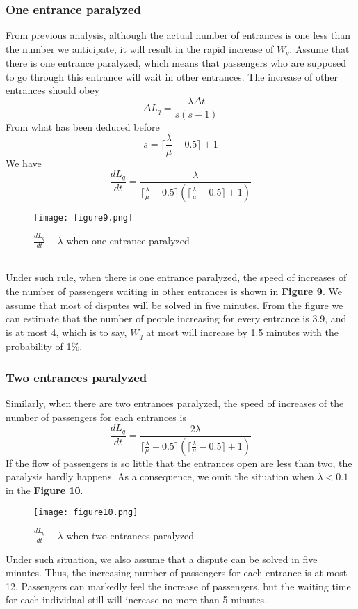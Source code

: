 \documentclass{mcmthesis}
\begin{document}
\subsubsection{One entrance paralyzed}
From previous analysis, although the actual number of entrances is one less than the number we anticipate, it will result in the rapid increase of $W_q$. Assume that there is one entrance paralyzed, which means that passengers who are supposed to go through this entrance will wait in other entrances. The increase of other entrances should obey
$$\Delta L_q=\frac{\lambda\Delta t}{s(s-1)}$$
From what has been deduced before
$$s=\lceil\frac{\lambda}{\mu}-0.5\rceil+1$$
We have
$$\frac{dL_q}{dt}=\frac{\lambda}{\lceil\frac{\lambda}{\mu}-0.5\rceil(\lceil\frac{\lambda}{\mu}-0.5\rceil +1)}$$
\begin{figure}[h]
\small
\centering
\texttt{[image: figure9.png]}
\caption{$\frac{dL_q}{dt}-\lambda$ when one entrance paralyzed} \label{fig:9}
\end{figure}\\
Under such rule, when there is one entrance paralyzed, the speed of increases of the number of passengers waiting in other entrances is shown in \textbf{Figure 9}. We assume that most of disputes will be solved in five minutes. From the figure we can estimate that the number of people increasing for every entrance is 3.9, and is at most 4, which is to say, $W_q$ at most will increase by 1.5 minutes with the probability of 1\%.
\subsubsection{Two entrances paralyzed}
Similarly, when there are two entrances paralyzed, the speed of increases of the number of passengers for each entrances is
$$\frac{dL_q}{dt}=\frac{2\lambda}{\lceil\frac{\lambda}{\mu}-0.5\rceil(\lceil\frac{\lambda}{\mu}-0.5\rceil +1)}$$
If the flow of passengers is so little that the entrances open are less than two, the paralysis hardly happens. As a consequence, we omit the situation when $\lambda<0.1$ in the \textbf{Figure 10}.
\begin{figure}[h]
\small
\centering
\texttt{[image: figure10.png]}
\caption{$\frac{dL_q}{dt}-\lambda$ when two entrances paralyzed} \label{fig:10}
\end{figure}
Under such situation, we also assume that a dispute can be solved in five minutes. Thus, the increasing number of passengers for each entrance is at most 12. Passengers can markedly feel the increase of passengers, but the waiting time for each individual still will increase no more than 5 minutes.
\end{document}
